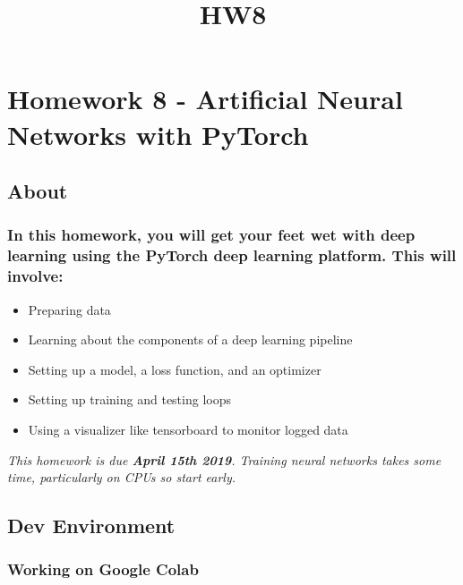 \documentclass[11pt]{article}
\title{HW8}
\providecommand{\tightlist}{%
      \setlength{\itemsep}{0pt}\setlength{\parskip}{0pt}}
\begin{document}
    
    
    \maketitle
    
    

    
    \section{Homework 8 - Artificial Neural Networks with
PyTorch}\label{homework-8---artificial-neural-networks-with-pytorch}

    \subsection{About}\label{about}

    \subsubsection{In this homework, you will get your feet wet with deep
learning using the PyTorch deep learning platform. This will
involve:}\label{in-this-homework-you-will-get-your-feet-wet-with-deep-learning-using-the-pytorch-deep-learning-platform.-this-will-involve}

\begin{itemize}
\tightlist
\item
  Preparing data
\item
  Learning about the components of a deep learning pipeline
\item
  Setting up a model, a loss function, and an optimizer
\item
  Setting up training and testing loops
\item
  Using a visualizer like tensorboard to monitor logged data
\end{itemize}

\emph{This homework is due \textbf{April 15th 2019}. Training neural
networks takes some time, particularly on CPUs so start early.}

    \subsection{Dev Environment}\label{dev-environment}

\subsubsection{Working on Google Colab}\label{working-on-google-colab}
\end{document}
